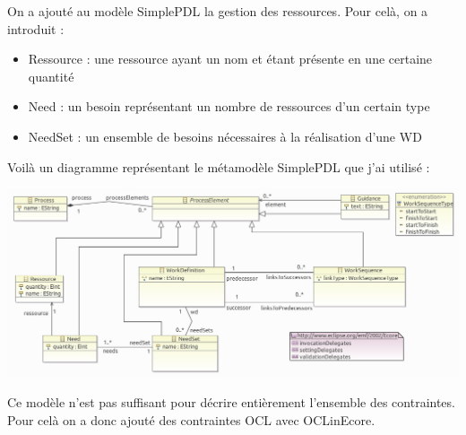 On a ajouté au modèle SimplePDL la gestion des ressources.
Pour celà, on a introduit :
\begin{itemize}
\item Ressource : une ressource ayant un nom et étant présente en une certaine quantité
\item Need : un besoin représentant un nombre de ressources d'un certain type
\item NeedSet : un ensemble de besoins nécessaires à la réalisation d'une WD
\end{itemize}

\vspace{1em}
Voilà un diagramme représentant le métamodèle SimplePDL que j'ai utilisé :
\begin{center}
\includegraphics[width=\textwidth]{../Images/meta_pdl.png}
\end{center}

\newpage
Ce modèle n'est pas suffisant pour décrire entièrement l'ensemble des contraintes. Pour celà on a donc ajouté des contraintes OCL avec OCLinEcore.\\

